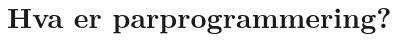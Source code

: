 \section{Hva er parprogrammering?}

\subsection{}

\cite{kattan2018}
\cite{McDowell2006}
\cite{hannay2009}
\cite{kniberg2015}
